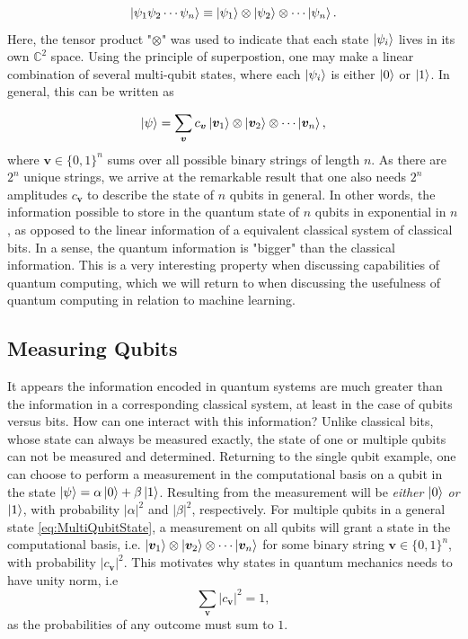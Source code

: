 \begin{equation}\label{eq:tensorProductState}
\ket{\psi_1 \psi_2 \cdots \psi_n} \equiv \ket{\psi_1} \otimes \ket{\psi_2} \otimes \cdots \ket{\psi_n}.
\end{equation}
Here, the tensor product "$\otimes$" was used to indicate that each state $\ket{\psi_i}$ lives in its own $\mathbb{C}^2$ space. Using the principle of superpostion, one may make a linear combination of several multi-qubit states, where each $\ket{\psi_i}$ is either $\ket{0}$ or $\ket{1}$. In general, this can be written as

\begin{equation}\label{eq:MultiQubitState}
\ket{\psi} = \sum_{\boldsymbol{v}}c_{\boldsymbol{v}}\ket{\boldsymbol{v}_1} \otimes \ket{\boldsymbol{v}_2} \otimes \cdots \ket{\boldsymbol{v}_n},
\end{equation}
where $\boldsymbol{v} \in \{0,1\}^n$ sums over all possible binary strings of length $n$. As there are $2^n$ unique strings, we arrive at the remarkable result that one also needs $2^n$ amplitudes $c_{\boldsymbol{v}}$ to describe the state of $n$ qubits in general. In other words, the information possible to store in the quantum state of $n$ qubits in exponential in $n$, as opposed to the linear information of a equivalent classical system of classical bits. In a sense, the quantum information is "bigger" than the classical information. This is a very interesting property when discussing capabilities of quantum computing, which we will return to when discussing the usefulness of quantum computing in relation to machine learning.

\subsection{Measuring Qubits}\label{sec:MeasuringState}
It appears the information encoded in quantum systems are much greater than the information in a corresponding classical system, at least in the case of qubits versus bits. How can one interact with this information? Unlike classical bits, whose state can always be measured exactly, the state of one or multiple qubits can not be measured and determined. Returning to the single qubit example, one can choose to perform a measurement in the computational basis on a qubit in the state $\ket{\psi} = \alpha \ket{0} + \beta \ket{1}$. Resulting from the measurement will be \emph{either} $\ket{0}$ \emph{or} $\ket{1}$, with probability $|\alpha|^2$ and $|\beta|^2$, respectively. For multiple qubits in a general state \autoref{eq:MultiQubitState}, a measurement on all qubits will grant a state in the computational basis, i.e. $\ket{\boldsymbol{v}_1} \otimes \ket{\boldsymbol{v}_2} \otimes \cdots \ket{\boldsymbol{v}_n}$ for some binary string $\boldsymbol{v} \in \{0,1\}^n$, with probability $|c_{\boldsymbol{v}}|^2$. This motivates why states in quantum mechanics needs to have unity norm, i.e
\begin{equation}\label{eq:MultiQubitState}
\sum_{\boldsymbol{v}}|c_{\boldsymbol{v}}|^2 = 1,
\end{equation} 
as the probabilities of any outcome must sum to $1$.

